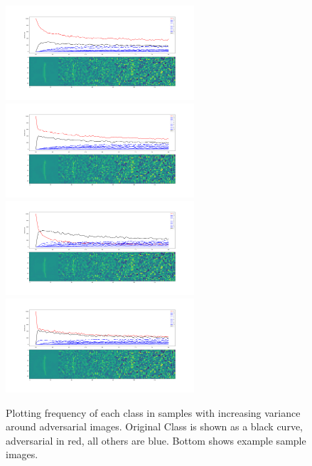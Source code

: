 \documentclass[10pt]{extarticle}
\begin{document}
\begin{figure}[H]
\label{fgsme}
\includegraphics[trim=200 80 100 100, clip,width=7cm]{2019-04-10-adverse/Image918-O1A2_varx40.png}\includegraphics[trim=200 80 100 100, clip,width=7cm]{2019-04-10-adverse/Image918-O1A3_varx40.png}
\includegraphics[trim=200 80 100 100, clip,width=7cm]{2019-04-10-adverse/Image918-O1A4_varx40.png}\includegraphics[trim=200 80 100 100, clip,width=7cm]{2019-04-10-adverse/Image918-O1A5_varx40.png}
\caption{Plotting frequency of each class in samples with increasing variance around adversarial images. Original Class is shown as a black curve, adversarial in red, all others are blue. 
Bottom shows example sample images. }
\end{figure}
\end{document}
